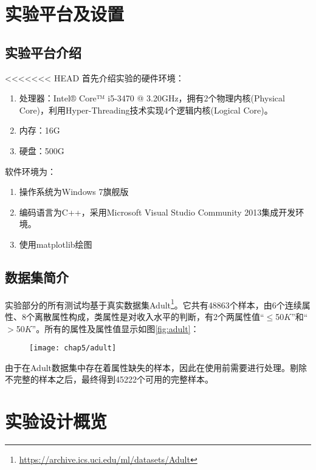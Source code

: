 \section{实验平台及设置}

\subsection{实验平台介绍}
<<<<<<< HEAD
首先介绍实验的硬件环境：
\begin{enumerate}
	\item 处理器：Intel® Core™ i5-3470 @ 3.20GHz，拥有2个物理内核(Physical Core)，利用Hyper-Threading技术实现4个逻辑内核(Logical Core)。
	\item 内存：16G
	\item 硬盘：500G
\end{enumerate}

软件环境为：
\begin{enumerate}
	\item 操作系统为Windows 7旗舰版
	\item 编码语言为C++，采用Microsoft Visual Studio Community 2013集成开发环境。
	\item 使用matplotlib绘图
\end{enumerate}

\subsection{数据集简介}

实验部分的所有测试均基于真实数据集Adult\footnote{\url{https://archive.ics.uci.edu/ml/datasets/Adult}}\cite{adult}。它共有48863个样本，由6个连续属性、8个离散属性构成，类属性是对收入水平的判断，有2个两属性值“$\leqslant$50$K$”和“$>$50$K$”。所有的属性及属性值显示如图\ref{fig:adult}：

\begin{figure}[!htp]
	\centering
	\texttt{[image: chap5/adult]}
\end{figure}

由于在Adult数据集中存在着属性缺失的样本，因此在使用前需要进行处理。剔除不完整的样本之后，最终得到45222个可用的完整样本。

\section{实验设计概览}

